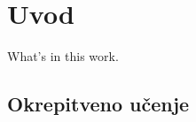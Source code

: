 \documentclass[a4paper, oneside, 12pt]{article}
\begin{document}
\listoffigures
\newpage



\section{Uvod}


What's in this work.


\subsection{Okrepitveno učenje}
\end{document}

